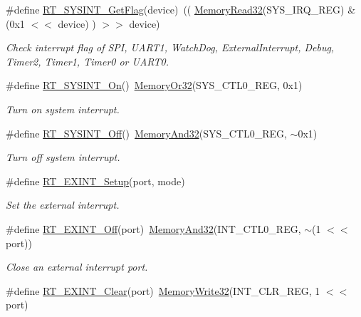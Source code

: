 \begin{DoxyCompactItemize}
\item 
\#define \mbox{\hyperlink{a00011_a397366295a7d6d3ed47e5e3d69549448}{R\+T\+\_\+\+S\+Y\+S\+I\+N\+T\+\_\+\+Get\+Flag}}(device)~(( \mbox{\hyperlink{a00020_a2d484dc15bdf30ee11ab3b05f31f0e16}{Memory\+Read32}}(S\+Y\+S\+\_\+\+I\+R\+Q\+\_\+\+R\+EG) \& (0x1 $<$$<$ device) ) $>$$>$ device)
\begin{DoxyCompactList}\small\item\em Check interrupt flag of S\+PI, U\+A\+R\+T1, Watch\+Dog, External\+Interrupt, Debug, Timer2, Timer1, Timer0 or U\+A\+R\+T0. \end{DoxyCompactList}\item 
\#define \mbox{\hyperlink{a00011_a5ddacb2147f802d2af2f507e41043504}{R\+T\+\_\+\+S\+Y\+S\+I\+N\+T\+\_\+\+On}}()~\mbox{\hyperlink{a00020_a27874a97deab7cecdde5ddecf466e31e}{Memory\+Or32}}(S\+Y\+S\+\_\+\+C\+T\+L0\+\_\+\+R\+EG, 0x1)
\begin{DoxyCompactList}\small\item\em Turn on system interrupt. \end{DoxyCompactList}\item 
\#define \mbox{\hyperlink{a00011_a9c68b82296205323f01358d9a27813a9}{R\+T\+\_\+\+S\+Y\+S\+I\+N\+T\+\_\+\+Off}}()~\mbox{\hyperlink{a00020_ad87cedffcaadc51db22594fce55173d4}{Memory\+And32}}(S\+Y\+S\+\_\+\+C\+T\+L0\+\_\+\+R\+EG, $\sim$0x1)
\begin{DoxyCompactList}\small\item\em Turn off system interrupt. \end{DoxyCompactList}\item 
\#define \mbox{\hyperlink{a00011_a135ec6dd65a4ef971477debf65c6809f}{R\+T\+\_\+\+E\+X\+I\+N\+T\+\_\+\+Setup}}(port,  mode)
\begin{DoxyCompactList}\small\item\em Set the external interrupt. \end{DoxyCompactList}\item 
\#define \mbox{\hyperlink{a00011_aa1a62e0954243f0c0fc8ec850ea2eebe}{R\+T\+\_\+\+E\+X\+I\+N\+T\+\_\+\+Off}}(port)~\mbox{\hyperlink{a00020_ad87cedffcaadc51db22594fce55173d4}{Memory\+And32}}(I\+N\+T\+\_\+\+C\+T\+L0\+\_\+\+R\+EG, $\sim$(1 $<$$<$ port))
\begin{DoxyCompactList}\small\item\em Close an external interrupt port. \end{DoxyCompactList}\item 
\#define \mbox{\hyperlink{a00011_a1bebef46f3eb19ed0c71deb174a4bbaf}{R\+T\+\_\+\+E\+X\+I\+N\+T\+\_\+\+Clear}}(port)~\mbox{\hyperlink{a00020_a6b9732365b12e48ddb89fe1028b975b0}{Memory\+Write32}}(I\+N\+T\+\_\+\+C\+L\+R\+\_\+\+R\+EG, 1 $<$$<$ port)

\end{DoxyCompactItemize}

